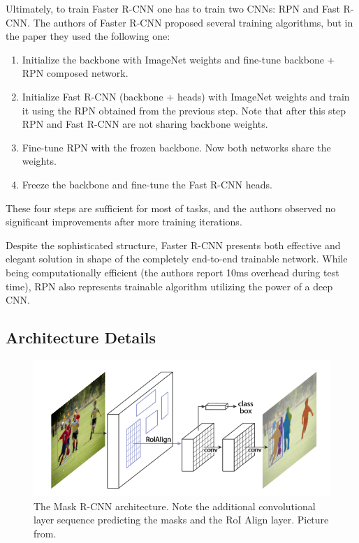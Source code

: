 \documentclass[thesis=B,english]{FITthesis}[2019/12/23]
\begin{document}
Ultimately, to train Faster R-CNN one has to train two CNNs: RPN and Fast R-CNN. The authors of Faster R-CNN proposed several training algorithms, but in the paper they used the following one:
\begin{enumerate}
	\item Initialize the backbone with ImageNet weights and fine-tune backbone + RPN composed network.
	\item Initialize Fast R-CNN (backbone + heads) with ImageNet weights and train it using the RPN obtained from the previous step. Note that after this step RPN and Fast R-CNN are not sharing backbone weights.
	\item Fine-tune RPN with the frozen backbone. Now both networks share the weights.
	\item Freeze the backbone and fine-tune the Fast R-CNN heads.
\end{enumerate}
These four steps are sufficient for most of tasks, and the authors observed no significant improvements after more training iterations.

Despite the sophisticated structure, Faster R-CNN presents both effective and elegant solution in shape of the completely end-to-end trainable network. While being computationally efficient (the authors report 10ms overhead during test time), RPN also represents trainable algorithm utilizing the power of a deep CNN.

\subsection{Architecture Details}

\begin{figure}[h]
	\centering
	\includegraphics[scale=0.66]{images/mrcnn.png}
	\caption{The Mask R-CNN architecture. Note the additional convolutional layer sequence predicting the masks and the RoI Align layer. Picture from\cite{mask_rcnn}.}
\end{figure}
\end{document}
